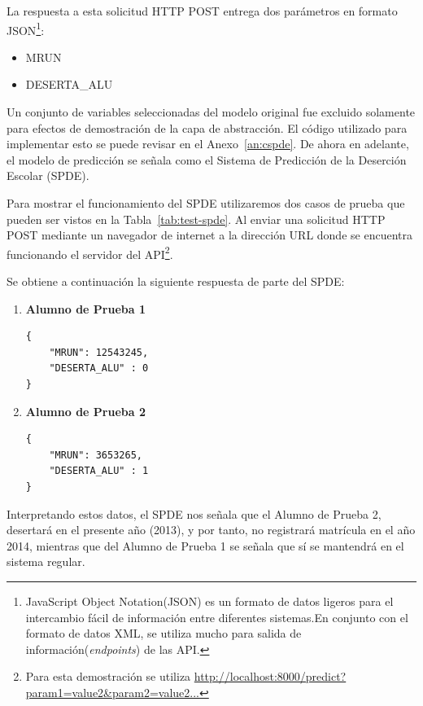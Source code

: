 La respuesta a esta solicitud HTTP POST entrega dos parámetros en formato JSON\footnote{JavaScript Object Notation(JSON) es un formato de datos ligeros para el intercambio fácil de información entre diferentes sistemas.En conjunto con el formato de datos XML, se utiliza mucho para salida de información(\textit{endpoints}) de las API.}:
\begin{itemize}
\item MRUN
\item DESERTA_ALU
\end{itemize}

Un conjunto de variables seleccionadas del modelo original fue excluido solamente para efectos de demostración de la capa de abstracción. El código utilizado para implementar esto se puede revisar en el Anexo~\ref{an:cspde}. De ahora en adelante, el modelo de predicción se señala como el Sistema de Predicción de la Deserción Escolar (SPDE).

Para mostrar el funcionamiento del SPDE utilizaremos dos casos de prueba que pueden ser vistos en la Tabla~\ref{tab:test-spde}. Al enviar una solicitud HTTP POST mediante un navegador de internet a la dirección URL donde se encuentra funcionando el servidor del API\footnote{Para esta demostración se utiliza \url{http://localhost:8000/predict?param1=value2&param2=value2...}}.

Se obtiene a continuación la siguiente respuesta de parte del SPDE:
\begin{enumerate}
\item  \textbf{Alumno de Prueba 1} \\ \hfill
\begin{verbatim}
{     
    "MRUN": 12543245,
    "DESERTA_ALU" : 0
}
\end{verbatim}
\item  \textbf{Alumno de Prueba 2} \\ \hfill
\begin{verbatim}
{     
    "MRUN": 3653265,
    "DESERTA_ALU" : 1
}
\end{verbatim}
\end{enumerate}

Interpretando estos datos, el SPDE nos señala que el Alumno de Prueba 2, desertará en el presente año (2013), y por tanto, no registrará matrícula en el año 2014, mientras que del Alumno de Prueba 1 se señala que sí se mantendrá en el sistema regular.

